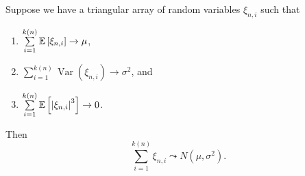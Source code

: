 \begin{theorem} \label{3-7-2}
	Suppose we have a triangular array of random variables $\xi_{n,i}$ such that
	\begin{enumerate}[label=(\roman*)]
		\item $\sum\limits_{i=1}^{k(n)} \mathbb{E}\left[\xi_{n,i}\right] \to \mu$,
		\item $\sum\limits_{i=1}^{k(n)} \operatorname{Var}\left(\xi_{n,i}\right) \to \sigma^2$, and
		\item $\sum\limits_{i=1}^{k(n)} \mathbb{E}\left[\left| \xi_{n,i} \right|^3\right] \to 0$.
	\end{enumerate}
	Then \[
		\sum\limits_{i=1}^{k(n)} \xi_{n,i} \leadsto N\left( \mu,\sigma^2 \right)
	.\] 
\end{theorem}

